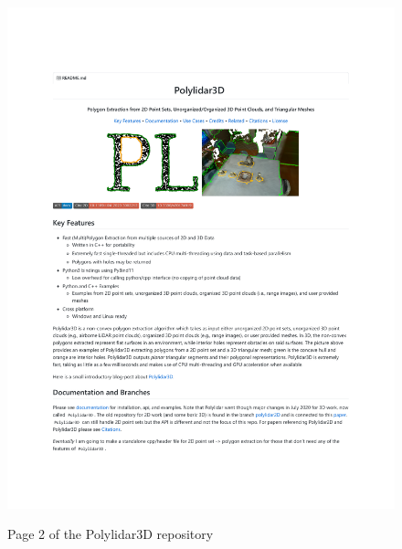 \begin{figure}[h!]
    \centering\includegraphics[page=2, trim=1.0in 1.0in 1.0in 1.0in, width=.93\linewidth]{appendix_1/imgs/Polylidar3DReadme.pdf}
    \label{fig:apx1_pl2}
    \caption{Page 2 of the Polylidar3D repository} 
\end{figure}


